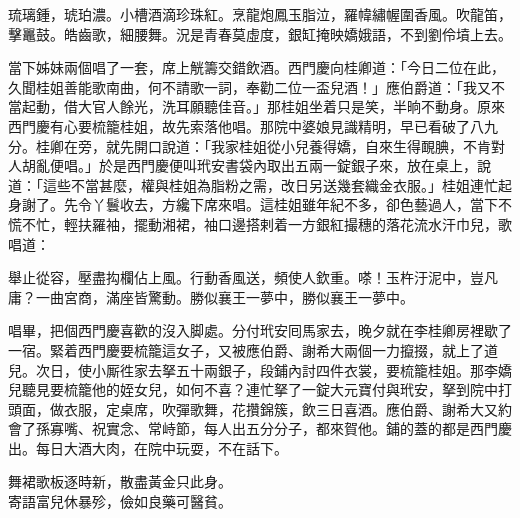 \begin{myquote}
琉璃鍾，琥珀濃。小槽酒滴珍珠紅。烹龍炮鳳玉脂泣，羅幃繡幄圍香風。吹龍笛，擊鼉鼓。皓齒歌，細腰舞。況是青春莫虛度，銀缸掩映嬌娥語，不到劉伶墳上去。
\end{myquote}

當下姊妹兩個唱了一套，席上觥籌交錯飲酒。西門慶向桂卿道：「今日二位在此，久聞桂姐善能歌南曲，何不請歌一詞，奉勸二位一盃兒酒！」應伯爵道：「我又不當起動，借大官人餘光，洗耳願聽佳音。」那桂姐坐着只是笑，半晌不動身。原來西門慶有心要梳籠桂姐，故先索落他唱。那院中婆娘見識精明，早已看破了八九分。桂卿在旁，就先開口說道：「我家桂姐從小兒養得嬌，自來生得靦腆，不肯對人胡亂便唱。」於是西門慶便叫玳安書袋內取出五兩一錠銀子來，放在桌上，說道：「這些不當甚麼，權與桂姐為脂粉之需，改日另送幾套織金衣服。」桂姐連忙起身謝了。{}先令丫鬟收去，方纔下席來唱。這桂姐雖年紀不多，卻色藝過人，當下不慌不忙，輕扶羅袖，擺動湘裙，袖口邊搭剌着一方銀紅撮穗的落花流水汗巾兒，{}歌唱道：

\begin{myquote}
舉止從容，壓盡抅欄佔上風。行動香風送，頻使人欽重。嗏！玉杵汙泥中，豈凡庸？一曲宮商，滿座皆驚動。勝似襄王一夢中，勝似襄王一夢中。
\end{myquote}

唱畢，把個西門慶喜歡的沒入脚處。分付玳安囘馬家去，晚夕就在李桂卿房裡歇了一宿。緊着西門慶要梳籠這女子，又被應伯爵、謝希大兩個一力攛掇，就上了道兒。次日，使小厮徃家去拏五十兩銀子，段鋪內討四件衣裳，要梳籠桂姐。那李嬌兒聽見要梳籠他的姪女兒，{}如何不喜？連忙拏了一錠大元寶付與玳安，拏到院中打頭面，做衣服，定桌席，吹彈歌舞，花攢錦簇，飲三日喜酒。應伯爵、謝希大又約會了孫寡嘴、祝實念、常峙節，每人出五分分子，都來賀他。鋪的蓋的都是西門慶出。每日大酒大肉，在院中玩耍，不在話下。

\begin{myquote}
舞裙歌板逐時新，散盡黃金只此身。\\寄語富兒休暴殄，儉如良藥可醫貧。
\end{myquote}

